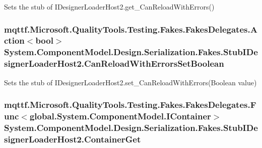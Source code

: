 Sets the stub of I\-Designer\-Loader\-Host2.\-get\-\_\-\-Can\-Reload\-With\-Errors()

\hypertarget{class_system_1_1_component_model_1_1_design_1_1_serialization_1_1_fakes_1_1_stub_i_designer_loader_host2_a301f21b1ec1997cd7ffe6c74ff2f019d}{
\subsubsection[{Can\-Reload\-With\-Errors\-Set\-Boolean}]{\setlength{\rightskip}{0pt plus 5cm}mqttf.\-Microsoft.\-Quality\-Tools.\-Testing.\-Fakes.\-Fakes\-Delegates.\-Action$<$bool$>$ System.\-Component\-Model.\-Design.\-Serialization.\-Fakes.\-Stub\-I\-Designer\-Loader\-Host2.\-Can\-Reload\-With\-Errors\-Set\-Boolean}}\label{class_system_1_1_component_model_1_1_design_1_1_serialization_1_1_fakes_1_1_stub_i_designer_loader_host2_a301f21b1ec1997cd7ffe6c74ff2f019d}


Sets the stub of I\-Designer\-Loader\-Host2.\-set\-\_\-\-Can\-Reload\-With\-Errors(\-Boolean value)

\hypertarget{class_system_1_1_component_model_1_1_design_1_1_serialization_1_1_fakes_1_1_stub_i_designer_loader_host2_a890bc080cf91a74461c09c63321a2e09}{
\subsubsection[{Container\-Get}]{\setlength{\rightskip}{0pt plus 5cm}mqttf.\-Microsoft.\-Quality\-Tools.\-Testing.\-Fakes.\-Fakes\-Delegates.\-Func$<$global.\-System.\-Component\-Model.\-I\-Container$>$ System.\-Component\-Model.\-Design.\-Serialization.\-Fakes.\-Stub\-I\-Designer\-Loader\-Host2.\-Container\-Get}}\label{class_system_1_1_component_model_1_1_design_1_1_serialization_1_1_fakes_1_1_stub_i_designer_loader_host2_a890bc080cf91a74461c09c63321a2e09}


